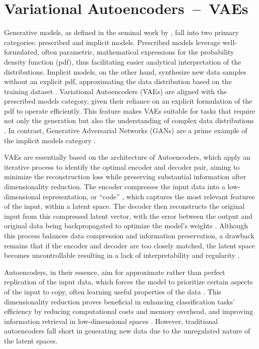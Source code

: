 \section{Variational Autoencoders~--~VAEs}\label{VAEs}

Generative models, as defined in the seminal work by \citeauthor{diggleImplicitPrescribed}, fall into two primary categories: prescribed and implicit models. Prescribed models leverage well-formulated, often parametric, mathematical expressions for the probability density function (pdf), thus facilitating easier analytical interpretation of the distributions. Implicit models, on the other hand, synthesize new data samples without an explicit pdf, approximating the data distribution based on the training dataset \citep{diggleImplicitPrescribed}. Variational Autoencoders (VAEs) are aligned with the prescribed models category, given their reliance on an explicit formulation of the pdf to operate efficiently. This feature makes VAEs suitable for tasks that require not only the generation but also the understanding of complex data distributions \citep{kingmaVAE,rezendeVAE,GoodfellowDeepLearning}. In contrast, Generative Adversarial Networks (GANs) are a prime example of the implicit models category \citep{goodfellowGAN}.

VAEs are essentially based on the architecture of Autoencoders, which apply an iterative process to identify the optimal encoder and decoder pair, aiming to minimize the reconstruction loss while preserving substantial information after dimensionality reduction. The encoder compresses the input data into a low-dimensional representation, or ``code'' \citep{hintonCode, GoodfellowDeepLearning}, which captures the most relevant features of the input, within a latent space. The decoder then reconstructs the original input from this compressed latent vector, with the error between the output and original data being backpropagated to optimize the model’s weights \citep{GoodfellowDeepLearning, michelucci2022introduction}. Although this process balances data compression and information preservation, a drawback remains that if the encoder and decoder are too closely matched, the latent space becomes uncontrollable resulting in a lack of interpretability and regularity \citep{michelucci2022introduction}.

Autoencoders, in their essence, aim for approximate rather than perfect replication of the input data, which forces the model to prioritize certain aspects of the input to copy, often learning useful properties of the data \citep{GoodfellowDeepLearning}. This dimensionality reduction proves beneficial in enhancing classification tasks' efficiency by reducing computational costs and memory overhead, and improving information retrieval in low-dimensional spaces \citep{GoodfellowDeepLearning}. However, traditional autoencoders fall short in generating new data due to the unregulated nature of the latent spaces.

